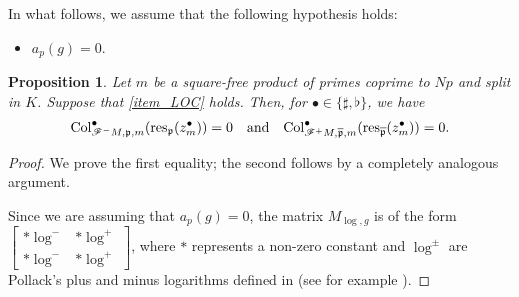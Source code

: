 \documentclass{amsart}
\makeatletter
\numberwithin{equation}{section}
\newcommand{\mylabel}[2]{#2\def\@currentlabel{#2}\label{#1}}
\newtheorem{proposition}[theorem]{Proposition}
\newcommand{\frk}{\mathfrak}
\newcommand{\col}{\mathrm{Col}}
\newcommand{\res}{\textup{res}}
\makeatother
\begin{document}
In what follows, we assume that the following hypothesis holds:
 \begin{itemize}
        \item[(\mylabel{item_LOC}{\textbf{LOC}})] $a_p(g)=0$.
    \end{itemize}


\begin{proposition}\label{prop:vanishing-col}
    Let $m$ be a square-free product of primes coprime to $Np$ and split in $K$. Suppose that \eqref{item_LOC} holds. Then, for $\bullet\in\lbrace \sharp,\flat\rbrace$, we have 
    \[
    \col^\bullet_{\mathscr{F}^-M,\frk{p},m}(\res_{\frk{p}}(z_m^\bullet))=0 \quad \text{and} \quad \col^\bullet_{\mathscr{F}^+M,\overline{\frk{p}},m}(\res_{\overline{\frk{p}}}(z_m^\bullet))=0.
    \]
\end{proposition}
\begin{proof}
We prove the first equality; the second follows by a completely analogous argument.

Since we are assuming that $a_p(g)=0$, the matrix $M_{\log,g}$ is of the form $\begin{bmatrix}
    *\log^-&*\log^+\\
    *\log^-&*\log^+
\end{bmatrix}$, where $*$ represents a non-zero constant and $\log^\pm$ are Pollack's plus and minus logarithms defined in \cite{pollack03} (see for example \cite[Appendix~4]{buyukboduklei0}). 



\end{proof}
\end{document}
